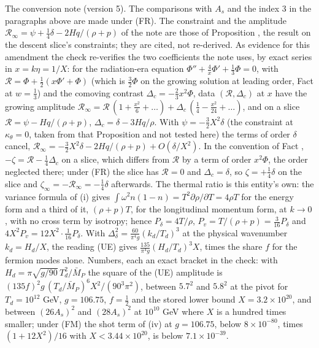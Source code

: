 The conversion note (version 5). The comparisons with $A_{s}$ and the index $3$ in the paragraphs above are made under (FR). The constraint and the amplitude $\mathcal{R}_{\infty} = \psi + \tfrac14\delta - 2Hq/(\rho + p)$ of the note are those of Proposition , the result on the descent slice's constraints; they are cited, not re-derived. As evidence for this amendment the check re-verifies the two coefficients the note uses, by exact series in $x = k\eta = 1/X$: for the radiation-era equation $\Phi'' + \tfrac4x\Phi' + \tfrac13\Phi = 0$, with $\mathcal{R} = \Phi + \tfrac12(x\Phi' + \Phi)$ (which is $\tfrac32\Phi$ on the growing solution at leading order, Fact  at $w = \tfrac13$) and the comoving contrast $\Delta_{c} = -\tfrac23x^{2}\Phi$, data $(\mathcal{R}, \Delta_{c})$ at $x$ have the growing amplitude $\mathcal{R}_{\infty} = \mathcal{R}\,(1 + \tfrac{x^{2}}{6} + \dots) + \Delta_{c}\,(\tfrac14 - \tfrac{x^{2}}{24} + \dots)$, and on a slice $\mathcal{R} = \psi - Hq/(\rho + p)$, $\Delta_{c} = \delta - 3Hq/\rho$. With $\psi = -\tfrac32X^{2}\delta$ (the constraint at $\kappa_{\theta} = 0$, taken from that Proposition and not tested here) the terms of order $\delta$ cancel, $\mathcal{R}_{\infty} = -\tfrac32X^{2}\delta - 2Hq/(\rho + p) + O(\delta/X^{2})$. In the convention of Fact , $-\zeta = \mathcal{R} - \tfrac14\Delta_{c}$ on a slice, which differs from $\mathcal{R}$ by a term of order $x^{2}\Phi$, the order neglected there; under (FR) the slice has $\mathcal{R} = 0$ and $\Delta_{c} = \delta$, so $\zeta = +\tfrac14\delta$ on the slice and $\zeta_{\infty} = -\mathcal{R}_{\infty} = -\tfrac14\delta$ afterwards. The thermal ratio is this entity's own: the variance formula of (i) gives $\int\omega^{2}n(1 - n) = T^{2}\partial\rho/\partial T = 4\rho T$ for the energy form and a third of it, $(\rho + p)T$, for the longitudinal momentum form, at $k \to 0$, with no cross term by isotropy; hence $P_{\delta} = 4T/\rho$, $P_{v} = T/(\rho + p) = \tfrac{3}{16}P_{\delta}$ and $4X^{2}P_{v} = 12X^{2}\cdot\tfrac{1}{16}P_{\delta}$. With $\Delta_{\delta}^{2} = \tfrac{60}{\pi^{4}g}(k_{d}/T_{d})^{3}$ at the physical wavenumber $k_{d} = H_{d}/X$, the reading (UE) gives $\tfrac{135}{\pi^{4}g}(H_{d}/T_{d})^{3}X$, times the share $f$ for the fermion modes alone. Numbers, each an exact bracket in the check: with $H_{d} = \pi\sqrt{g/90}\,T_{d}^{2}/\bar M_{P}$ the square of the (UE) amplitude is $(135f)^{2}g\,(T_{d}/\bar M_{P})^{6}X^{2}/(90^{3}\pi^{2})$, between $5.7^{2}$ and $5.8^{2}$ at the pivot for $T_{d} = 10^{12}$ GeV, $g = 106.75$, $f = \tfrac12$ and the stored lower bound $X = 3.2 \times 10^{20}$, and between $(26A_{s})^{2}$ and $(28A_{s})^{2}$ at $10^{10}$ GeV where $X$ is a hundred times smaller; under (FM) the shot term of (iv) at $g = 106.75$, below $8 \times 10^{-80}$, times $(1 + 12X^{2})/16$ with $X < 3.44 \times 10^{20}$, is below $7.1 \times 10^{-39}$.
